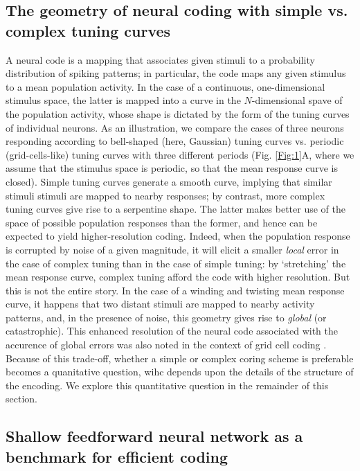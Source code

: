 \documentclass[a4paper]{article}%
\begin{document}
\subsection{The geometry of neural coding with simple vs. complex tuning
curves}

A neural code is a mapping that associates given stimuli to a probability
distribution of spiking patterns; in particular, the code maps any given
stimulus to a mean population activity. In the case of a continuous,
one-dimensional stimulus space, the latter is mapped into a curve in the
$N$-dimensional spave of the population activity, whose shape is dictated by
the form of the tuning curves of individual neurons. As an illustration, we
compare the cases of three neurons responding according to bell-shaped (here,
Gaussian) tuning curves vs. periodic (grid-cells-like) tuning curves with
three different periods (Fig. \ref{Fig:1}A, where we assume that the stimulus
space is periodic, so that the mean response curve is closed). Simple tuning
curves generate a smooth curve, implying that similar stimuli stimuli are
mapped to nearby responses; by contrast, more complex tuning curves give rise
to a serpentine shape. The latter makes better use of the space of possible
population responses than the former, and hence can be expected to yield
higher-resolution coding. Indeed, when the population response is corrupted by
noise of a given magnitude, it will elicit a smaller \textit{local} error in
the case of complex tuning than in the case of simple tuning: by `stretching'
the mean response curve, complex tuning afford the code with higher
resolution. But this is not the entire story. In the case of a winding and
twisting mean response curve, it happens that two distant stimuli are mapped
to nearby activity patterns, and, in the presence of noise, this geometry
gives rise to \textit{global} (or catastrophic). This enhanced resolution of
the neural code associated with the accurence of global errors was also noted
in the context of grid cell coding \cite{Sreenivasan2011GridComputation}.
Because of this trade-off, whether a simple or complex coring scheme is
preferable becomes a quanitative question, wihc depends upon the details of
the structure of the encoding. We explore this quantitative question in the
remainder of this section.

\subsection{Shallow feedforward neural network as a benchmark for efficient
coding}
\end{document}
